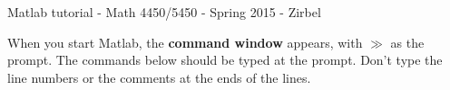 
\usepackage{hyperref}              %



\renewcommand{\baselinestretch}{1.1}

\begin{center} {\sc
Matlab tutorial - Math 4450/5450 - Spring 2015 - Zirbel}\\
\end{center}

\renewcommand{\blist}[1]{\begin{list}{{\arabic{enumi}:}}{\usecounter{enumi}\setlength{\itemsep}{#1}}}
\renewcommand{\elist}{\end{list}}

When you start Matlab, the {\bf command window} appears, with $\gg$ as the prompt.
The commands below should be typed at the prompt.
Don't type the line numbers or the comments at the ends of the lines.

